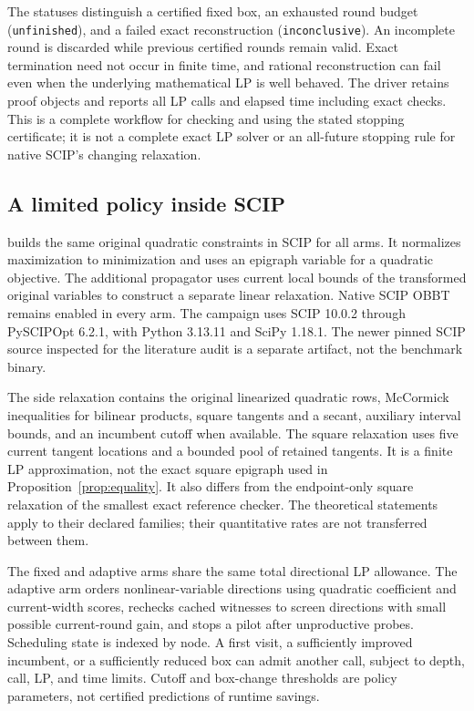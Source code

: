 The statuses distinguish a certified fixed box, an exhausted round
budget (\texttt{unfinished}), and a failed exact reconstruction
(\texttt{inconclusive}). An incomplete round is discarded while previous
certified rounds remain valid. Exact termination need not occur in
finite time, and rational reconstruction can fail even when the
underlying mathematical LP is well behaved. The driver retains proof
objects and reports all LP calls and elapsed time including exact checks.
This is a complete workflow for checking and using the stated stopping
certificate; it is not a complete exact LP solver or an all-future
stopping rule for native SCIP's changing relaxation.

\subsection{A limited policy inside SCIP}

 builds
the same original quadratic constraints in SCIP for all arms. It
normalizes maximization to minimization and uses an epigraph variable
for a quadratic objective. The additional propagator uses current local
bounds of the transformed original variables to construct a separate
linear relaxation. Native SCIP OBBT remains enabled in every arm.
The campaign uses SCIP 10.0.2 through PySCIPOpt 6.2.1, with Python
3.13.11 and SciPy 1.18.1. The newer pinned SCIP source inspected for
the literature audit is a separate artifact, not the benchmark binary.

The side relaxation contains the original linearized quadratic rows,
McCormick inequalities for bilinear products, square tangents and a
secant, auxiliary interval bounds, and an incumbent cutoff when available.
The square relaxation uses five current tangent locations and a bounded
pool of retained tangents. It is a finite LP approximation, not the
exact square epigraph used in Proposition~\ref{prop:equality}. It also
differs from the endpoint-only square relaxation of the smallest exact
reference checker. The theoretical statements apply to their declared
families; their quantitative rates are not transferred between them.

The fixed and adaptive arms share the same total directional LP allowance.
The adaptive arm orders nonlinear-variable directions using quadratic
coefficient and current-width scores, rechecks cached witnesses to screen
directions with small possible current-round gain, and stops a pilot
after unproductive probes. Scheduling state is indexed by node. A first
visit, a sufficiently improved incumbent, or a sufficiently reduced box
can admit another call, subject to depth, call, LP, and time limits.
Cutoff and box-change thresholds are policy parameters, not certified
predictions of runtime savings.

